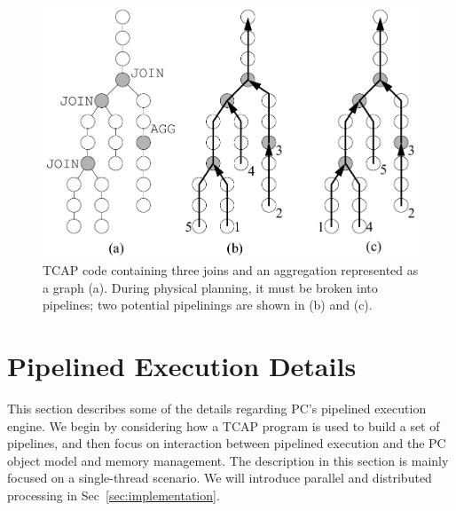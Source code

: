 
\begin{figure}[t]
  \begin{center}
    \includegraphics[width=6in]{DAG}
  \end{center}
\vspace{-10 pt}
  \caption{TCAP code containing three joins and an aggregation represented as a graph (a).  During physical planning, it must be broken into pipelines; two
potential pipelinings are shown in (b) and (c).}
  \label{fig:TCAP}
\end{figure}


\section{Pipelined Execution Details}
\label{sec:pipelined}

This section describes some of the details regarding PC's pipelined execution engine.  We begin by considering how a TCAP
program is used to build a set of pipelines, and then focus on interaction between pipelined execution and the PC object model
and memory management. The description in this section is mainly focused on a
single-thread scenario. We will introduce parallel and distributed
processing in Sec~\ref{sec:implementation}.

